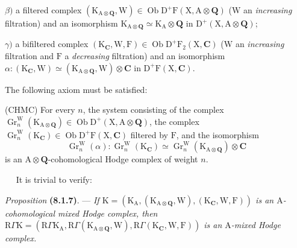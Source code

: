 \documentclass[11pt,leqno]{article}
\newcommand{\Page}[1]{\ifvmode\noindent\else\unskip\ \fi{\footnotesize\textcolor{gray}{[p.\,#1]}}\ \ignorespaces}
\begin{document}
\(\beta)\) a filtered complex \((\mathrm{K}_{\mathrm{A}\otimes\mathbf{Q}},\mathrm{W})\in\operatorname{Ob}\mathrm{D}^{+}\mathrm{F}(\mathrm{X},\mathrm{A}\otimes\mathbf{Q})\) (\(\mathrm{W}\) an \textit{increasing} filtration) and an isomorphism \(\mathrm{K}_{\mathrm{A}\otimes\mathbf{Q}}\simeq\mathrm{K}_{\mathrm{A}}\otimes\mathbf{Q}\) in \(\mathrm{D}^{+}(\mathrm{X},\mathrm{A}\otimes\mathbf{Q})\);

\(\gamma)\) a bifiltered complex \((\mathrm{K}_{\mathbf{C}},\mathrm{W},\mathrm{F})\in\operatorname{Ob}\mathrm{D}^{+}\mathrm{F}_{2}(\mathrm{X},\mathbf{C})\) (\(\mathrm{W}\) an \textit{increasing} filtration and \(\mathrm{F}\) a \textit{decreasing} filtration) and an isomorphism \(\alpha:(\mathrm{K}_{\mathbf{C}},\mathrm{W})\simeq(\mathrm{K}_{\mathrm{A}\otimes\mathbf{Q}},\mathrm{W})\otimes\mathbf{C}\) in \(\mathrm{D}^{+}\mathrm{F}(\mathrm{X},\mathbf{C})\).

The following axiom must be satisfied:

(CHMC) For every \(n\), the system consisting of the complex \(\operatorname{Gr}_{n}^{\mathrm{W}}(\mathrm{K}_{\mathrm{A}\otimes\mathbf{Q}})\in\operatorname{Ob}\mathrm{D}^{+}(\mathrm{X},\mathrm{A}\otimes\mathbf{Q})\), the complex \(\operatorname{Gr}_{n}^{\mathrm{W}}(\mathrm{K}_{\mathbf{C}})\in\operatorname{Ob}\mathrm{D}^{+}\mathrm{F}(\mathrm{X},\mathbf{C})\) filtered by \(\mathrm{F}\), and the isomorphism
\[
\operatorname{Gr}_{n}^{\mathrm{W}}(\alpha):
\operatorname{Gr}_{n}^{\mathrm{W}}(\mathrm{K}_{\mathbf{C}})
\simeq
\operatorname{Gr}_{n}^{\mathrm{W}}(\mathrm{K}_{\mathrm{A}\otimes\mathbf{Q}})\otimes\mathbf{C}
\]
is an \(\mathrm{A}\otimes\mathbf{Q}\)-cohomological Hodge complex of weight \(n\).

\Page{30}
It is trivial to verify:

\textit{Proposition} \textbf{(8.1.7)}. — \textit{If \(\mathrm{K}=(\mathrm{K}_{\mathrm{A}},(\mathrm{K}_{\mathrm{A}\otimes\mathbf{Q}},\mathrm{W}),(\mathrm{K}_{\mathbf{C}},\mathrm{W},\mathrm{F}))\) is an \(\mathrm{A}\)-cohomological mixed Hodge complex, then \(\mathrm{R}\Gamma\mathrm{K}=(\mathrm{R}\Gamma\mathrm{K}_{\mathrm{A}},\mathrm{R}\Gamma(\mathrm{K}_{\mathrm{A}\otimes\mathbf{Q}},\mathrm{W}),\mathrm{R}\Gamma(\mathrm{K}_{\mathbf{C}},\mathrm{W},\mathrm{F}))\) is an \(\mathrm{A}\)-mixed Hodge complex.}
\end{document}
